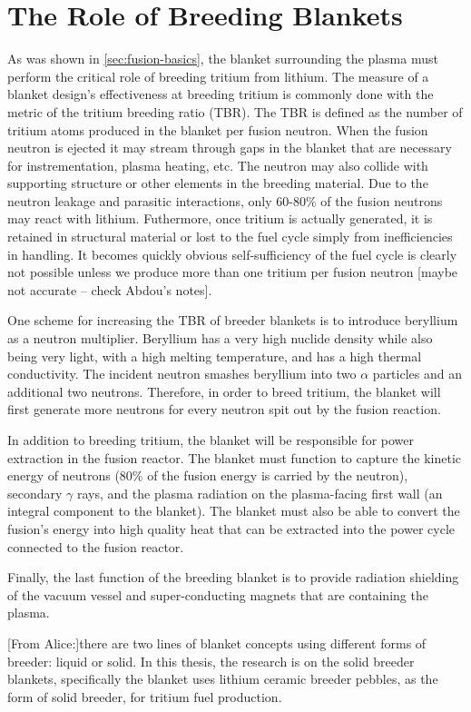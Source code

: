 \section{The Role of Breeding Blankets}
As was shown in \cref{sec:fusion-basics}, the blanket surrounding the plasma must perform the critical role of breeding tritium from lithium. The measure of a blanket design's effectiveness at breeding tritium is commonly done with the metric of the tritium breeding ratio (TBR). The TBR is defined as the number of tritium atoms produced in the blanket per fusion neutron. When the fusion neutron is ejected it may stream through gaps in the blanket that are necessary for instrementation, plasma heating, etc. The neutron may also collide with supporting structure or other elements in the breeding material. Due to the neutron leakage and parasitic interactions, only 60-80\% of the fusion neutrons may react with lithium. Futhermore, once tritium is actually generated, it is retained in structural material or lost to the fuel cycle simply from inefficiencies in handling. It becomes quickly obvious self-sufficiency of the fuel cycle is clearly not possible unless we produce more than one tritium per fusion neutron [maybe not accurate -- check Abdou's notes]. 

One scheme for increasing the TBR of breeder blankets is to introduce beryllium as a neutron multiplier. Beryllium has a very high nuclide density while also being very light, with a high melting temperature, and has a high thermal conductivity. The incident neutron smashes beryllium into two $\alpha$ particles and an additional two neutrons. Therefore, in order to breed tritium, the blanket will first generate more neutrons for every neutron spit out by the fusion reaction.

In addition to breeding tritium, the blanket will be responsible for power extraction in the fusion reactor. The blanket must function to capture the kinetic energy of neutrons (80\% of the fusion energy is carried by the neutron), secondary $\gamma$ rays, and the plasma radiation on the plasma-facing first wall (an integral component to the blanket). The blanket must also be able to convert the fusion's energy into high quality heat that can be extracted into the power cycle connected to the fusion reactor. 

Finally, the last function of the breeding blanket is to provide radiation shielding of the vacuum vessel and super-conducting magnets that are containing the plasma. 

[From Alice:]there are two lines of blanket concepts using different forms of breeder: liquid or solid. In this thesis, the research is on the solid breeder blankets, specifically the blanket uses lithium ceramic breeder pebbles, as the form of solid breeder, for tritium fuel production. 